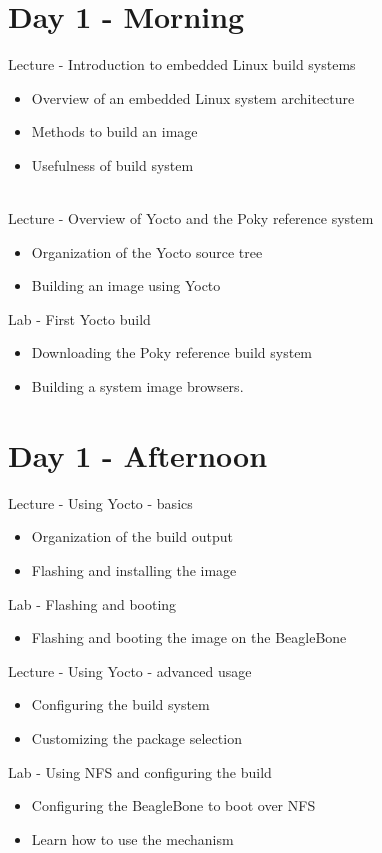 \documentclass[a4paper,12pt,obeyspaces,spaces,hyphens]{article}
\begin{document}
\section{Day 1 - Morning}

\feagendaonecolumn
{Lecture - Introduction to embedded Linux build systems}
{
  \begin{itemize}
  \item Overview of an embedded Linux system architecture
  \item Methods to build an image
  \item Usefulness of build system
  \end{itemize}
}
\\
\feagendatwocolumn
{Lecture - Overview of Yocto and the Poky reference system}
{
  \begin{itemize}
  \item Organization of the Yocto source tree
  \item Building an image using Yocto
  \end{itemize}
}
{Lab - First Yocto build}
{
  \begin{itemize}
  \item Downloading the Poky reference build system
  \item Building a system image
    browsers.
 \end{itemize}
}

\section{Day 1 - Afternoon}
\feagendatwocolumn
{Lecture - Using Yocto - basics}
{
  \begin{itemize}
  \item Organization of the build output
  \item Flashing and installing the image
  \end{itemize}
}
{Lab - Flashing and booting}
{
  \begin{itemize}
  \item Flashing and booting the image on the BeagleBone
  \end{itemize}
}

\feagendatwocolumn
{Lecture - Using Yocto - advanced usage}
{
  \begin{itemize}
  \item Configuring the build system
  \item Customizing the package selection
  \end{itemize}
}
{Lab - Using NFS and configuring the build}
{
  \begin{itemize}
  \item Configuring the BeagleBone to boot over NFS
  \item Learn how to use the  mechanism
  \end{itemize}
}
\\
\end{document}
